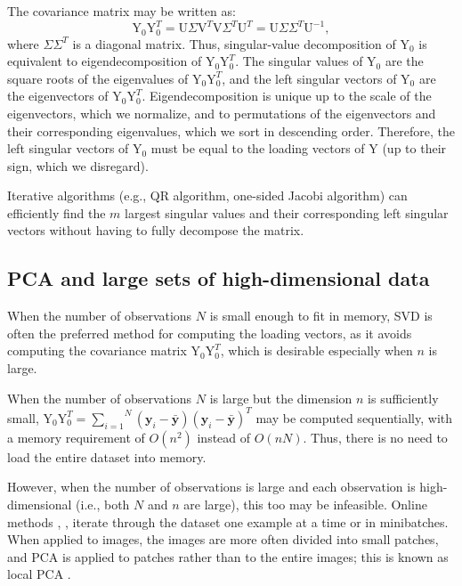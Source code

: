 \documentclass[journal]{IEEEtran}
\begin{document}
The covariance matrix may be written as:
\[
\text{Y}_0 \text{Y}_0^T = \text{U} \Sigma \text{V}^T \text{V} \Sigma^T  \text{U}^T =  \text{U} \Sigma \Sigma^T \text{U}^{-1},
\]
where $\Sigma \Sigma^T$ is a diagonal matrix. Thus, singular-value decomposition of $\text{Y}_0$ is equivalent to eigendecomposition of $\text{Y}_0 \text{Y}_0^T$. The singular values of $\text{Y}_0$ are the square roots of the eigenvalues of $\text{Y}_0 \text{Y}_0^T$, and the left singular vectors of $\text{Y}_0$ are the eigenvectors of $\text{Y}_0 \text{Y}_0^T$. Eigendecomposition is unique up to the scale of the eigenvectors, which we normalize, and to permutations of the eigenvectors and their corresponding eigenvalues, which we sort in descending order. Therefore, the left singular vectors of $\text{Y}_0$ must be equal to the loading vectors of $\text{Y}$ (up to their sign, which we disregard).

Iterative algorithms (e.g., QR algorithm, one-sided Jacobi algorithm) can efficiently find the $m$ largest singular values and their corresponding left singular vectors without having to fully decompose the matrix.

\subsection{PCA and large sets of high-dimensional data}
When the number of observations $N$ is small enough to fit in memory, SVD is often the preferred method for computing the loading vectors, as it avoids computing the covariance matrix $\text{Y}_0 \text{Y}_0^T$, which is desirable especially when $n$ is large. 

When the number of observations $N$ is large but the dimension $n$ is sufficiently small, $\text{Y}_0 \text{Y}_0^T = \overset{N}{\underset{i=1}{\sum}} \left(\textbf{y}_i-\bar{\textbf{y}}\right) \left(\textbf{y}_i-\bar{\textbf{y}}\right)^T$ may be computed sequentially, with a memory requirement of $O \left( n^2 \right)$ instead of $O \left( nN \right)$. Thus, there is no need to load the entire dataset into memory.

However, when the number of observations is large and each observation is high-dimensional (i.e., both $N$ and $n$ are large), this too may be infeasible. Online methods \cite{Online1}, \cite{Online2}, \cite{Online3} iterate through the dataset one example at a time or in minibatches. When applied to images, the images are more often divided into small patches, and PCA is applied to patches rather than to the entire images; this is known as local PCA \cite{LocalPCA}.
\end{document}
